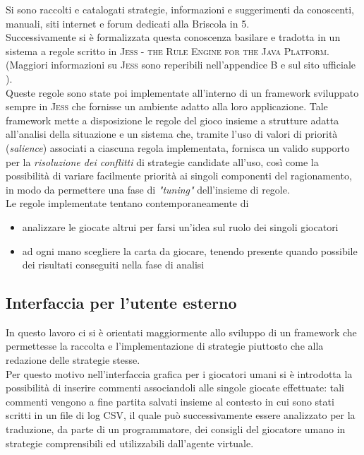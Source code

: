 Si sono raccolti e catalogati strategie, informazioni e suggerimenti da conoscenti, manuali, siti internet e forum dedicati alla Briscola in 5.\\
Successivamente si è formalizzata questa conoscenza basilare e tradotta in un sistema a regole scritto in \textsc{Jess -  the Rule Engine for the Java Platform}. (Maggiori informazioni su \textsc{Jess} sono reperibili nell'appendice B e sul sito ufficiale \cite{jess}).\\
Queste regole sono state poi implementate all'interno di un framework sviluppato sempre in \textsc{Jess} che fornisse un ambiente adatto alla loro applicazione.
Tale framework mette a disposizione le regole del gioco insieme a strutture adatta all'analisi della situazione e un sistema che, tramite l'uso di valori di priorità (\emph{salience}) associati a ciascuna regola implementata, fornisca un valido supporto per la \emph{risoluzione dei conflitti} di strategie candidate all'uso, così come la possibilità di variare facilmente priorità ai singoli componenti del ragionamento, in modo da permettere una fase di \emph{"tuning"} dell'insieme di regole.\\
Le regole implementate tentano contemporaneamente di 
\begin{itemize}
  \item analizzare le giocate altrui per farsi un'idea sul ruolo dei singoli giocatori
  \item ad ogni mano scegliere la carta da giocare, tenendo presente quando possibile dei risultati conseguiti nella fase di analisi 
\end{itemize}

\subsection{Interfaccia per l'utente esterno}
In questo lavoro ci si è orientati maggiormente allo sviluppo di un framework che permettesse la raccolta e l'implementazione di strategie piuttosto che alla redazione delle strategie stesse.\\
Per questo motivo nell'interfaccia grafica per i giocatori umani si è introdotta la possibilità di inserire commenti associandoli alle singole giocate effettuate: tali commenti vengono a fine partita salvati insieme al contesto in cui sono stati scritti in un file di log CSV, il quale può successivamente essere analizzato per la traduzione, da parte di un programmatore, dei consigli del giocatore umano in strategie comprensibili ed utilizzabili dall'agente virtuale.
